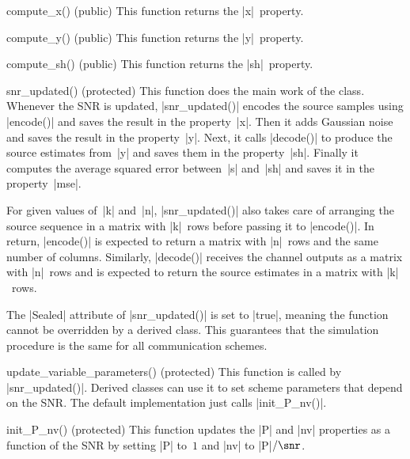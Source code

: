 \begin{method}{compute\_x(\obj) (public)}
  This function returns the |x|~property.
\end{method}
\begin{method}{compute\_y(\obj) (public)}
  This function returns the |y|~property.
\end{method}
\begin{method}{compute\_sh(\obj) (public)}
  This function returns the |sh|~property.
\end{method}

\begin{method}{snr_updated(\obj) (protected)}
  This function does the main work of the class. Whenever the SNR is updated,
  |snr_updated()| encodes the source samples using |encode()| and saves the
  result in the property~|x|. Then it adds Gaussian noise and saves the result
  in the property~|y|. Next, it calls |decode()| to produce the source estimates
  from~|y| and saves them in the property~|sh|. Finally it computes the average
  squared error between~|s| and~|sh| and saves it in the property~|mse|. 

  For given values of~|k| and~|n|, |snr_updated()| also takes care of arranging
  the source sequence in a matrix with |k|~rows before passing it to |encode()|.
  In return, |encode()| is expected to return a matrix with |n|~rows and the
  same number of columns. Similarly, |decode()| receives the channel outputs as
  a matrix with |n|~rows and is expected to return the source estimates in a
  matrix with |k|~rows. 

  The |Sealed| attribute of |snr_updated()| is set to |true|, meaning the
  function cannot be overridden by a derived class. This guarantees that the
  simulation procedure is the same for all communication schemes. 
\end{method}

\begin{method}{update_variable_parameters(\obj) (protected)}
  This function is called by
  |snr_updated()|. Derived classes can use it to set scheme parameters that
  depend on the SNR. The default implementation just calls |init_P_nv()|.
\end{method}

\begin{method}{init_P_nv(\obj) (protected)}
  This function updates the |P| and |nv| properties as a function of the SNR by
  setting |P| to~$1$ and |nv| to |P|$ / \snr$.
\end{method}


